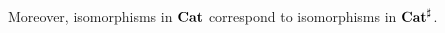 \documentclass[Book-Poly]{subfiles}
\begin{document}



Moreover, isomorphisms in $\mathbf{Cat}$ correspond to isomorphisms in $\mathbf{Cat}^\sharp$.
\end{document}
